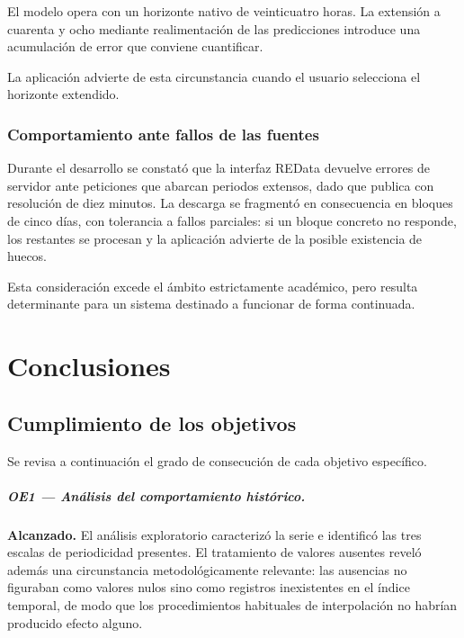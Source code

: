 El modelo opera con un horizonte nativo de veinticuatro horas. La extensión a
cuarenta y ocho mediante realimentación de las predicciones introduce una
acumulación de error que conviene cuantificar.


La aplicación advierte de esta circunstancia cuando el usuario selecciona el
horizonte extendido.

\subsection*{Comportamiento ante fallos de las fuentes}

Durante el desarrollo se constató que la interfaz REData devuelve errores de
servidor ante peticiones que abarcan periodos extensos, dado que publica con
resolución de diez minutos. La descarga se fragmentó en consecuencia en bloques de
cinco días, con tolerancia a fallos parciales: si un bloque concreto no responde,
los restantes se procesan y la aplicación advierte de la posible existencia de
huecos.

Esta consideración excede el ámbito estrictamente académico, pero resulta
determinante para un sistema destinado a funcionar de forma continuada.



\chapter{Conclusiones}

\section{Cumplimiento de los objetivos}

Se revisa a continuación el grado de consecución de cada objetivo específico.

\paragraph{OE1 — Análisis del comportamiento histórico.}
\textbf{Alcanzado.} El análisis exploratorio caracterizó la serie e identificó las
tres escalas de periodicidad presentes. El tratamiento de valores ausentes reveló
además una circunstancia metodológicamente relevante: las ausencias no figuraban
como valores nulos sino como registros inexistentes en el índice temporal, de modo
que los procedimientos habituales de interpolación no habrían producido efecto
alguno.

